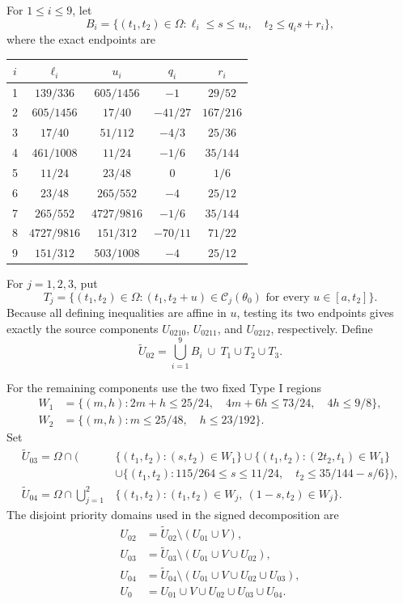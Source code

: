 For $1\le i\le9$, let
\[
 B_i=\{(t_1,t_2)\in\Omega:
            \ell_i\le s\le u_i,\quad t_2\le q_i s+r_i\},
\]
where the exact endpoints are
\begin{center}
\small
\begin{tabular}{@{}ccccc@{}}
\toprule
$i$ & $\ell_i$ & $u_i$ & $q_i$ & $r_i$\\
\midrule
1 & $139/336$ & $605/1456$ & $-1$ & $29/52$\\
2 & $605/1456$ & $17/40$ & $-41/27$ & $167/216$\\
3 & $17/40$ & $51/112$ & $-4/3$ & $25/36$\\
4 & $461/1008$ & $11/24$ & $-1/6$ & $35/144$\\
5 & $11/24$ & $23/48$ & $0$ & $1/6$\\
6 & $23/48$ & $265/552$ & $-4$ & $25/12$\\
7 & $265/552$ & $4727/9816$ & $-1/6$ & $35/144$\\
8 & $4727/9816$ & $151/312$ & $-70/11$ & $71/22$\\
9 & $151/312$ & $503/1008$ & $-4$ & $25/12$\\
\bottomrule
\end{tabular}
\end{center}
For $j=1,2,3$, put
\[
 T_j=\{(t_1,t_2)\in\Omega:
       (t_1,t_2+u)\in\mathcal C_j(\theta_0)
                     \text{ for every }u\in[a,t_2]\}.
\]
Because all defining inequalities are affine in $u$, testing its two
endpoints gives exactly the source components $U_{0210}$,
$U_{0211}$, and $U_{0212}$, respectively. Define
\[
 \widetilde U_{02}=\bigcup_{i=1}^9B_i\ \cup\ T_1\cup T_2\cup T_3.
\]

For the remaining components use the two fixed Type I regions
\begin{align*}
 W_1&=\{(m,h):2m+h\le25/24,\quad
                      4m+6h\le73/24,\quad4h\le9/8\},\\
 W_2&=\{(m,h):m\le25/48,\quad h\le23/192\}.
\end{align*}
Set
\begin{align*}
 \widetilde U_{03}=\Omega\cap\bigl(&
  \{(t_1,t_2):(s,t_2)\in W_1\}
  \cup\{(t_1,t_2):(2t_2,t_1)\in W_1\}\\
  &\cup\{(t_1,t_2):115/264\le s\le11/24,
                             \quad t_2\le35/144-s/6\}\bigr),\\
 \widetilde U_{04}=\Omega\cap\bigcup_{j=1}^2
  &\{(t_1,t_2):(t_1,t_2)\in W_j,
                            \ (1-s,t_2)\in W_j\}.
\end{align*}
The disjoint priority domains used in the signed decomposition are
\begin{align*}
 U_{02}&=\widetilde U_{02}\setminus(U_{01}\cup V),\\
 U_{03}&=\widetilde U_{03}\setminus(U_{01}\cup V\cup U_{02}),\\
 U_{04}&=\widetilde U_{04}\setminus(U_{01}\cup V\cup U_{02}\cup U_{03}),\\
 U_0&=U_{01}\cup V\cup U_{02}\cup U_{03}\cup U_{04}.
\end{align*}

